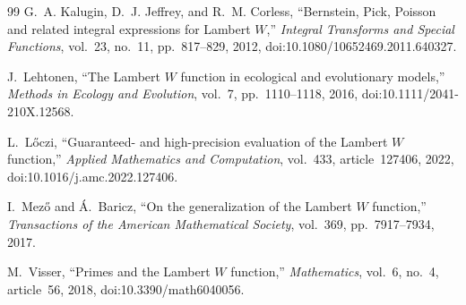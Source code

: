\documentclass[11pt]{article}
\theoremstyle{remark}
\begin{document}
\begin{thebibliography}{99}
G.~A. Kalugin, D.~J. Jeffrey, and R.~M. Corless,
``Bernstein, Pick, Poisson and related integral expressions for Lambert
\(W\),''
\emph{Integral Transforms and Special Functions}, vol.~23, no.~11,
pp.~817--829, 2012, doi:10.1080/10652469.2011.640327.

J.~Lehtonen,
``The Lambert \(W\) function in ecological and evolutionary models,''
\emph{Methods in Ecology and Evolution}, vol.~7, pp.~1110--1118, 2016,
doi:10.1111/2041-210X.12568.

L.~L\H{o}czi,
``Guaranteed- and high-precision evaluation of the Lambert \(W\) function,''
\emph{Applied Mathematics and Computation}, vol.~433, article~127406, 2022,
doi:10.1016/j.amc.2022.127406.

I.~Mez\H{o} and \'A.~Baricz,
``On the generalization of the Lambert \(W\) function,''
\emph{Transactions of the American Mathematical Society}, vol.~369,
pp.~7917--7934, 2017.

M.~Visser,
``Primes and the Lambert \(W\) function,''
\emph{Mathematics}, vol.~6, no.~4, article~56, 2018,
doi:10.3390/math6040056.

\end{thebibliography}
\end{document}
